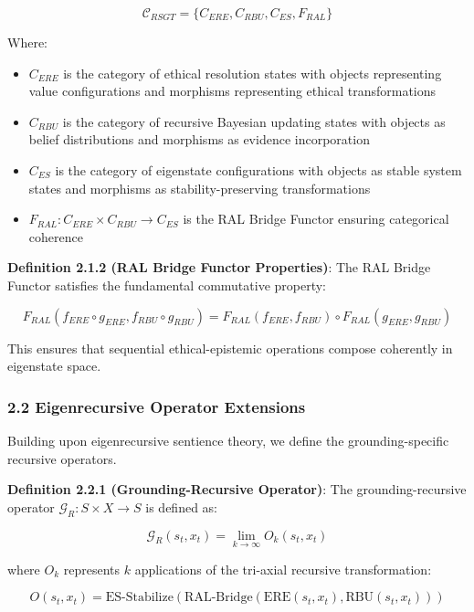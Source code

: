 \documentclass[
]{article}
\providecommand{\tightlist}{%
  \setlength{\itemsep}{0pt}\setlength{\parskip}{0pt}}
\begin{document}
\[\mathcal{C}_{RSGT} = \{C_{ERE}, C_{RBU}, C_{ES}, F_{RAL}\}\]

Where:

\begin{itemize}
\tightlist
\item
  \(C_{ERE}\) is the category of ethical resolution states with objects
  representing value configurations and morphisms representing ethical
  transformations
\item
  \(C_{RBU}\) is the category of recursive Bayesian updating states with
  objects as belief distributions and morphisms as evidence
  incorporation
\item
  \(C_{ES}\) is the category of eigenstate configurations with objects
  as stable system states and morphisms as stability-preserving
  transformations\\
\item
  \(F_{RAL}: C_{ERE} \times C_{RBU} \rightarrow C_{ES}\) is the RAL
  Bridge Functor ensuring categorical coherence
\end{itemize}

\textbf{Definition 2.1.2 (RAL Bridge Functor Properties)}: The RAL
Bridge Functor satisfies the fundamental commutative property:

\[F_{RAL}(f_{ERE} \circ g_{ERE}, f_{RBU} \circ g_{RBU}) = F_{RAL}(f_{ERE}, f_{RBU}) \circ F_{RAL}(g_{ERE}, g_{RBU})\]

This ensures that sequential ethical-epistemic operations compose
coherently in eigenstate space.

\subsubsection{2.2 Eigenrecursive Operator
Extensions}\label{eigenrecursive-operator-extensions}

Building upon eigenrecursive sentience theory, we define the
grounding-specific recursive operators.

\textbf{Definition 2.2.1 (Grounding-Recursive Operator)}: The
grounding-recursive operator \(\mathcal{G}_R: S \times X \rightarrow S\)
is defined as:

\[\mathcal{G}_R(s_t, x_t) = \lim_{k \rightarrow \infty} O_k(s_t, x_t)\]

where \(O_k\) represents \(k\) applications of the tri-axial recursive
transformation:

\[O(s_t, x_t) = \text{ES-Stabilize}(\text{RAL-Bridge}(\text{ERE}(s_t, x_t), \text{RBU}(s_t, x_t)))\]
\end{document}
